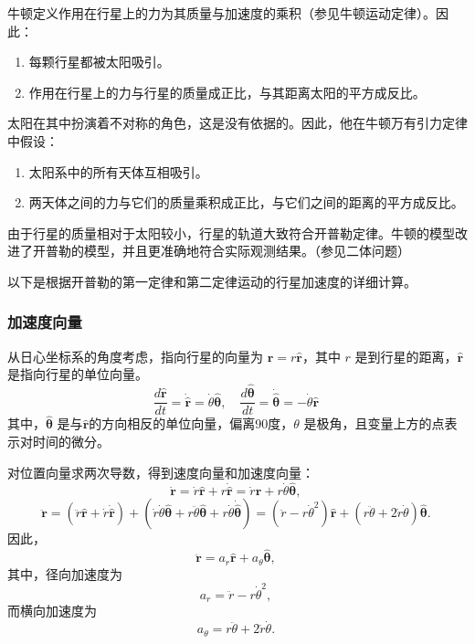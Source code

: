 牛顿定义作用在行星上的力为其质量与加速度的乘积（参见牛顿运动定律）。因此：
\begin{enumerate}
\item 每颗行星都被太阳吸引。  
\item 作用在行星上的力与行星的质量成正比，与其距离太阳的平方成反比。
\end{enumerate}
太阳在其中扮演着不对称的角色，这是没有依据的。因此，他在牛顿万有引力定律中假设：
\begin{enumerate}
\item 太阳系中的所有天体互相吸引。  
\item 两天体之间的力与它们的质量乘积成正比，与它们之间的距离的平方成反比。
\end{enumerate}  
由于行星的质量相对于太阳较小，行星的轨道大致符合开普勒定律。牛顿的模型改进了开普勒的模型，并且更准确地符合实际观测结果。（参见二体问题）

以下是根据开普勒的第一定律和第二定律运动的行星加速度的详细计算。
\subsubsection{加速度向量 }  
从日心坐标系的角度考虑，指向行星的向量为  
\(\mathbf{r} = r \hat{\mathbf{r}}\)，其中 \(r\) 是到行星的距离，\(\hat{\mathbf{r}}\) 是指向行星的单位向量。  
\[
\frac{d \hat{\mathbf{r}}}{dt} = \dot{\hat{\mathbf{r}}} = \dot{\theta} \hat{\boldsymbol{\theta}}, \quad \frac{d \hat{\boldsymbol{\theta}}}{dt} = \dot{\hat{\boldsymbol{\theta}}} = -\dot{\theta} \hat{\mathbf{r}}~
\]
其中，\(\hat{\boldsymbol{\theta}}\) 是与\(\hat{\mathbf{r}}\)的方向相反的单位向量，偏离90度，\(\theta\) 是极角，且变量上方的点表示对时间的微分。

对位置向量求两次导数，得到速度向量和加速度向量：
\[
\dot{\mathbf{r}} = \dot{r} \hat{\mathbf{r}} + r \dot{\hat{\mathbf{r}}} = \dot{r} \hat{\mathbf{r}} + r \dot{\theta} \hat{\boldsymbol{\theta}},~
\]                      
\[
\ddot{\mathbf{r}} = \left(\ddot{r} \hat{\mathbf{r}} + \dot{r} \dot{\hat{\mathbf{r}}}\right) + \left(\dot{r} \dot{\theta} \hat{\boldsymbol{\theta}} + r \ddot{\theta} \hat{\boldsymbol{\theta}} + r \dot{\theta} \dot{\hat{\boldsymbol{\theta}}}\right) = \left(\ddot{r} - r \dot{\theta}^2\right) \hat{\mathbf{r}} + \left(r \ddot{\theta} + 2 \dot{r} \dot{\theta}\right) \hat{\boldsymbol{\theta}}.~
\]
因此，  
\[
\ddot{\mathbf{r}} = a_r \hat{\boldsymbol{r}} + a_{\theta} \hat{\boldsymbol{\theta}},~
\]
其中，径向加速度为  
\[
a_r = \ddot{r} - r \dot{\theta}^2,~
\]
而横向加速度为  
\[
a_{\theta} = r \ddot{\theta} + 2 \dot{r} \dot{\theta}.~
\]
